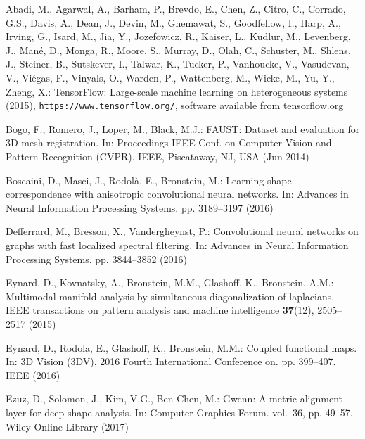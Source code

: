 \documentclass[runningheads]{llncs}
\begin{document}
%
%
\begin{thebibliography}{10}
\providecommand{\url}[1]{\texttt{#1}}
\providecommand{\urlprefix}{URL }
\providecommand{\doi}[1]{https://doi.org/#1}

Abadi, M., Agarwal, A., Barham, P., Brevdo, E., Chen, Z., Citro, C., Corrado,
  G.S., Davis, A., Dean, J., Devin, M., Ghemawat, S., Goodfellow, I., Harp, A.,
  Irving, G., Isard, M., Jia, Y., Jozefowicz, R., Kaiser, L., Kudlur, M.,
  Levenberg, J., Man\'{e}, D., Monga, R., Moore, S., Murray, D., Olah, C.,
  Schuster, M., Shlens, J., Steiner, B., Sutskever, I., Talwar, K., Tucker, P.,
  Vanhoucke, V., Vasudevan, V., Vi\'{e}gas, F., Vinyals, O., Warden, P.,
  Wattenberg, M., Wicke, M., Yu, Y., Zheng, X.: {TensorFlow}: Large-scale
  machine learning on heterogeneous systems (2015),
  \url{https://www.tensorflow.org/}, software available from tensorflow.org

Bogo, F., Romero, J., Loper, M., Black, M.J.: {FAUST}: Dataset and evaluation
  for {3D} mesh registration. In: Proceedings IEEE Conf. on Computer Vision and
  Pattern Recognition (CVPR). IEEE, Piscataway, NJ, USA (Jun 2014)

Boscaini, D., Masci, J., Rodol{\`a}, E., Bronstein, M.: Learning shape
  correspondence with anisotropic convolutional neural networks. In: Advances
  in Neural Information Processing Systems. pp. 3189--3197 (2016)

Defferrard, M., Bresson, X., Vandergheynst, P.: Convolutional neural networks
  on graphs with fast localized spectral filtering. In: Advances in Neural
  Information Processing Systems. pp. 3844--3852 (2016)

Eynard, D., Kovnatsky, A., Bronstein, M.M., Glashoff, K., Bronstein, A.M.:
  Multimodal manifold analysis by simultaneous diagonalization of laplacians.
  IEEE transactions on pattern analysis and machine intelligence
  \textbf{37}(12),  2505--2517 (2015)

Eynard, D., Rodola, E., Glashoff, K., Bronstein, M.M.: Coupled functional maps.
  In: 3D Vision (3DV), 2016 Fourth International Conference on. pp. 399--407.
  IEEE (2016)

Ezuz, D., Solomon, J., Kim, V.G., Ben-Chen, M.: Gwcnn: A metric alignment layer
  for deep shape analysis. In: Computer Graphics Forum. vol.~36, pp. 49--57.
  Wiley Online Library (2017)


\end{thebibliography}
\end{document}
